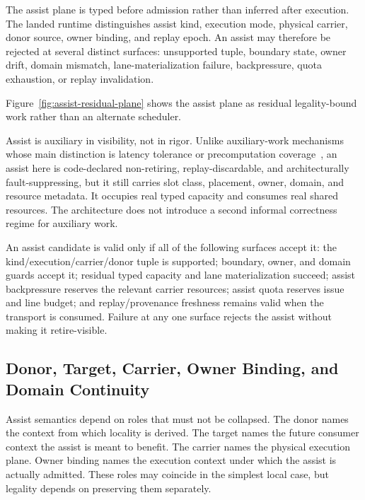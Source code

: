 \documentclass[twocolumn]{article}
\begin{document}
The assist plane is typed before admission rather than inferred after execution. The landed runtime distinguishes assist kind, execution mode, physical carrier, donor source, owner binding, and replay epoch. An assist may therefore be rejected at several distinct surfaces: unsupported tuple, boundary state, owner drift, domain mismatch, lane-materialization failure, backpressure, quota exhaustion, or replay invalidation.

Figure~\ref{fig:assist-residual-plane} shows the assist plane as residual legality-bound work rather than an alternate scheduler.



Assist is auxiliary in visibility, not in rigor. Unlike auxiliary-work mechanisms whose main distinction is latency tolerance or precomputation coverage~\cite{mutlu2003runahead,collins2001speculative,chappell1999ssmt}, an assist here is code-declared non-retiring, replay-discardable, and architecturally fault-suppressing, but it still carries slot class, placement, owner, domain, and resource metadata. It occupies real typed capacity and consumes real shared resources. The architecture does not introduce a second informal correctness regime for auxiliary work.

An assist candidate is valid only if all of the following surfaces accept it: the kind/execution/carrier/donor tuple is supported; boundary, owner, and domain guards accept it; residual typed capacity and lane materialization succeed; assist backpressure reserves the relevant carrier resources; assist quota reserves issue and line budget; and replay/provenance freshness remains valid when the transport is consumed. Failure at any one surface rejects the assist without making it retire-visible.


\subsection{Donor, Target, Carrier, Owner Binding, and Domain Continuity}

Assist semantics depend on roles that must not be collapsed. The donor names the context from which locality is derived. The target names the future consumer context the assist is meant to benefit. The carrier names the physical execution plane. Owner binding names the execution context under which the assist is actually admitted. These roles may coincide in the simplest local case, but legality depends on preserving them separately.
\end{document}
